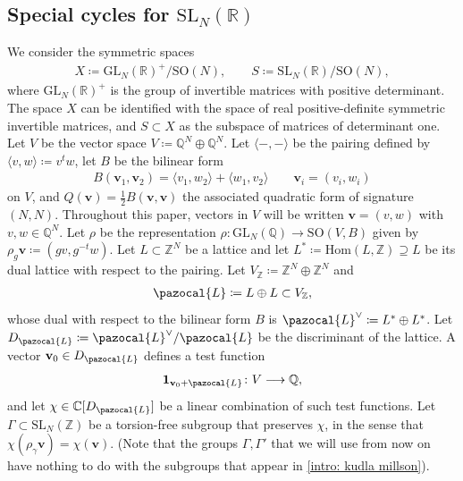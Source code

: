 \documentclass[a4paper,11pt]{amsart} %
\newcommand{\8}{\infty}
\newcommand{\Z}{\mathbb{Z}}
\newcommand{\id}{\mathbf{1}}
\newcommand{\vbf}{\mathbf{v}}
\newcommand{\SO}{\mathrm{SO}}
\newcommand{\SL}{\mathrm{SL}}
\newcommand{\GL}{\mathrm{GL}}
\newcommand{\R}{\mathbb{R}}
\newcommand{\Q}{\mathbb{Q}}
\newcommand{\C}{\mathbb{C}}
\newcommand{\Hom}{\mathrm{Hom}}
\newcommand{\Lcal}{\pazocal{L}}
\theoremstyle{mytheoremstyle}
\theoremstyle{remark}
\numberwithin{equation}{section}
\begin{document}
\subsection{Special cycles for $\SL_N(\R)$} 
We consider the symmetric spaces 
\begin{align}
X\coloneqq \GL_N(\R)^+/\SO(N), \qquad S\coloneqq \SL_N(\R)/\SO(N),
\end{align} where $\GL_N(\R)^+$ is the group of invertible matrices with positive determinant. The space $X$ can be identified with the space of real positive-definite symmetric invertible matrices, and $S \subset X$ as the subspace of matrices of determinant one. Let $V$ be the vector space $V \coloneqq \Q^N \oplus \Q^N$. Let $\langle-,-\rangle$ be the pairing defined by $\langle v,w\rangle \coloneqq v^tw$, let $B$ be the bilinear  form\begin{align}
B(\vbf_1,\vbf_2)=\langle v_1,w_2 \rangle +  \langle w_1,v_2 \rangle \qquad \vbf_i=(v_i,w_i)
\end{align} on $V$, and $Q(\vbf)=\frac{1}{2}B(\vbf,\vbf)$ the associated quadratic form of signature $(N,N)$. Throughout this paper, vectors in $V$ will be written $\vbf=(v,w)$ with $v,w \in \Q^N$. Let $\rho$ be the representation $\rho \colon \GL_N(\Q) \longrightarrow \SO(V,B)$ given by $\rho_g \vbf \coloneqq (gv,g^{-t}w)$. Let $L \subset \Z^N$ be a lattice and let $L^\ast \coloneqq \Hom(L,\Z) \supseteq L$ be its dual lattice with respect to the pairing. Let $V_\Z \coloneqq \Z^N \oplus \Z^N$ and
\begin{align}
\Lcal \coloneqq L \oplus L \subset V_\Z,
\end{align} whose dual with respect to the bilinear form $B$ is $\Lcal^\vee \coloneqq L^\ast\oplus L^\ast$. Let $D_\Lcal \coloneqq \Lcal^\vee/\Lcal$ be the discriminant of the lattice. A vector $\vbf_0 \in D_\Lcal$ defines a test function
\begin{align}
\id_{\vbf_0+\Lcal} \colon V \longrightarrow \Q,
\end{align}
and let $\chi \in \C[D_\Lcal]$ be a linear combination of such test functions. Let $\Gamma \subset \SL_N(\Z)$ be a torsion-free subgroup that preserves $\chi$, in the sense that $\chi(\rho_\gamma\vbf)=\chi(\vbf)$. (Note that the groups $\Gamma,\Gamma'$ that we will use from now on have nothing to do with the subgroups that appear in \ref{intro: kudla millson}).
\end{document}
